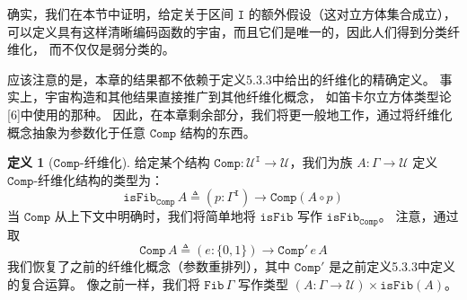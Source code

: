 \documentclass{ctexrep}
\theoremstyle{plain}
\theoremstyle{definition}
\newtheorem{definition}[theorem]{定义}
\theoremstyle{remark}
\begin{document}
确实，我们在本节中证明，给定关于区间 $\mathtt{I}$ 的额外假设（这对立方体集合成立），
可以定义具有这样清晰编码函数的宇宙，而且它们是唯一的，因此人们得到分类纤维化，
而不仅仅是弱分类的。

应该注意的是，本章的结果都不依赖于定义5.3.3中给出的纤维化的精确定义。
事实上，宇宙构造和其他结果直接推广到其他纤维化概念，
如笛卡尔立方体类型论[6]中使用的那种。
因此，在本章剩余部分，我们将更一般地工作，通过将纤维化概念抽象为参数化于任意 $\mathtt{Comp}$ 结构的东西。

\begin{definition}[$\mathtt{Comp}$-纤维化]
给定某个结构 $\mathtt{Comp} : \mathcal{U}^\mathtt{I} \to \mathcal{U}$，我们为族 $A : \Gamma \to \mathcal{U}$ 定义 $\mathtt{Comp}$-纤维化结构的类型为：
\[
\mathtt{isFib}_\mathtt{Comp}\,A \triangleq (p : \Gamma^\mathtt{I}) \to \mathtt{Comp}(A \circ p)
\]
当 $\mathtt{Comp}$ 从上下文中明确时，我们将简单地将 $\mathtt{isFib}$ 写作 $\mathtt{isFib}_\mathtt{Comp}$。
注意，通过取
\[
\mathtt{Comp}\,A \triangleq (e : \{0,1\}) \to \mathtt{Comp}'\,e\,A
\]
我们恢复了之前的纤维化概念（参数重排列），其中 $\mathtt{Comp}'$ 是之前定义5.3.3中定义的复合运算。
像之前一样，我们将 $\mathtt{Fib}\,\Gamma$ 写作类型 $(A : \Gamma \to \mathcal{U}) \times \mathtt{isFib}(A)$。
\end{definition}
\end{document}
